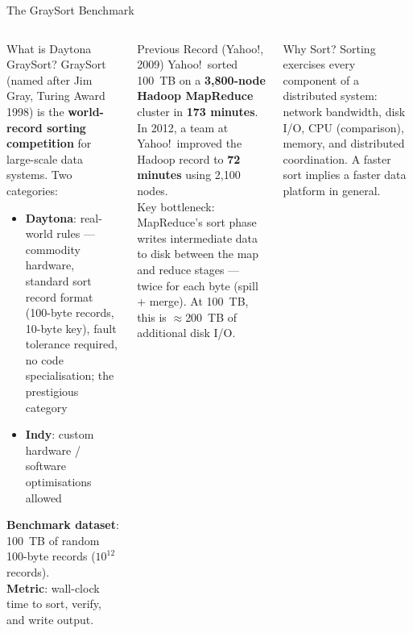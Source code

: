 \documentclass[aspectratio=169,10pt]{beamer}
\begin{document}
\begin{frame}{The GraySort Benchmark}
  \begin{columns}[T]
      \begin{block}{What is Daytona GraySort?}
        GraySort (named after Jim Gray, Turing Award 1998) is the
        \textbf{world-record sorting competition} for large-scale
        data systems.  Two categories:
        \begin{itemize}
          \item \textbf{Daytona}: real-world rules — commodity hardware,
                standard sort record format (100-byte records,
                10-byte key), fault tolerance required, no code
                specialisation; the prestigious category
          \item \textbf{Indy}: custom hardware / software optimisations
                allowed
        \end{itemize}
        \textbf{Benchmark dataset}: 100~TB of random 100-byte records
        ($10^{12}$ records).\\[4pt]
        \textbf{Metric}: wall-clock time to sort, verify, and write output.
      \end{block}

      \begin{alertblock}{Previous Record (Yahoo!, 2009)}
        Yahoo!\ sorted 100~TB on a \textbf{3{,}800-node Hadoop
        MapReduce} cluster in \textbf{173 minutes}.
        In 2012, a team at Yahoo!\ improved the Hadoop record to
        \textbf{72 minutes} using 2{,}100 nodes.\\[6pt]
        Key bottleneck: MapReduce's sort phase writes intermediate
        data to disk between the map and reduce stages —
        twice for each byte (spill + merge).
        At 100~TB, this is $\approx$200~TB of additional disk I/O.
      \end{alertblock}
      \vspace{5pt}
      \begin{exampleblock}{Why Sort?}
        Sorting exercises every component of a distributed system:
        network bandwidth, disk I/O, CPU (comparison), memory,
        and distributed coordination.
        A faster sort implies a faster data platform in general.
      \end{exampleblock}
  \end{columns}
\end{frame}
\end{document}
